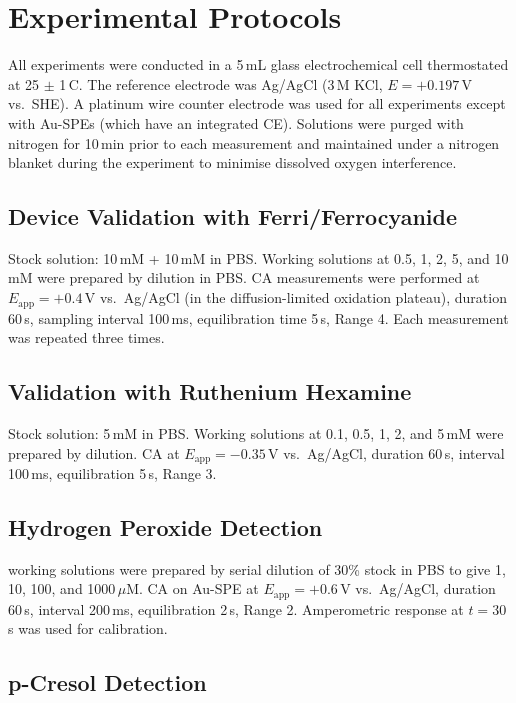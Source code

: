 \section{Experimental Protocols}
\label{sec:protocols}

All experiments were conducted in a 5\,mL glass electrochemical cell thermostated at 25 $\pm$ 1\,\textdegree{}C. The reference electrode was Ag/AgCl (3\,M KCl, $E = +0.197$\,V vs.\ SHE). A platinum wire counter electrode was used for all experiments except with Au-SPEs (which have an integrated CE). Solutions were purged with nitrogen for 10\,min prior to each measurement and maintained under a nitrogen blanket during the experiment to minimise dissolved oxygen interference.

\subsection{Device Validation with Ferri/Ferrocyanide}

Stock solution: 10\,mM  + 10\,mM  in PBS. Working solutions at 0.5, 1, 2, 5, and 10\,mM were prepared by dilution in PBS. CA measurements were performed at $E_\text{app} = +0.4$\,V vs.\ Ag/AgCl (in the diffusion-limited oxidation plateau), duration 60\,s, sampling interval 100\,ms, equilibration time 5\,s, Range 4. Each measurement was repeated three times.

\subsection{Validation with Ruthenium Hexamine}

Stock solution: 5\,mM  in PBS. Working solutions at 0.1, 0.5, 1, 2, and 5\,mM were prepared by dilution. CA at $E_\text{app} = -0.35$\,V vs.\ Ag/AgCl, duration 60\,s, interval 100\,ms, equilibration 5\,s, Range 3.

\subsection{Hydrogen Peroxide Detection}

 working solutions were prepared by serial dilution of 30\% stock in PBS to give 1, 10, 100, and 1000\,$\mu$M. CA on Au-SPE at $E_\text{app} = +0.6$\,V vs.\ Ag/AgCl, duration 60\,s, interval 200\,ms, equilibration 2\,s, Range 2. Amperometric response at $t = 30$\,s was used for calibration.

\subsection{p-Cresol Detection}

